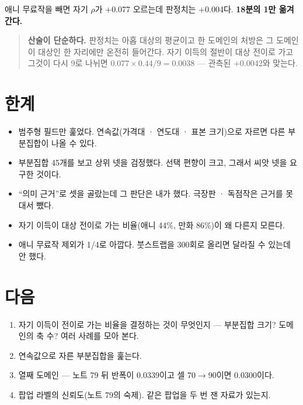 \documentclass[10pt]{article}
\begin{document}
애니 무료작을 빼면 자기 $\rho$가 $+$0.077 오르는데 판정치는 $+$0.004다.
\textbf{18분의 1만 옮겨간다.}


\begin{quote}\fontsize{9.5}{11.5}\selectfont
\textbf{산술이 단순하다.} 판정치는 아홉 대상의 평균이고 한 도메인의 처방은
그 도메인이 대상인 한 자리에만 온전히 들어간다. 자기 이득의 절반이 대상
전이로 가고 그것이 다시 9로 나뉘면 $0.077\times0.44/9=0.0038$ --- 관측된
$+$0.0042와 맞는다.
\end{quote}

\section{한계}

\begin{itemize}[leftmargin=1.1em,itemsep=0.15em]
\item 범주형 필드만 훑었다. 연속값(가격대 · 연도대 · 표본 크기)으로 자르면
      다른 부분집합이 나올 수 있다.
\item 부분집합 45개를 보고 상위 넷을 검정했다. 선택 편향이 크고, 그래서 씨앗
      넷을 요구한 것이다.
\item ``의미 근거''로 셋을 골랐는데 그 판단은 내가 했다. 극장판 · 독점작은
      근거를 못 대서 뺐다.
\item 자기 이득이 대상 전이로 가는 비율(애니 44\%, 만화 86\%)이 왜 다른지
      모른다.
\item 애니 무료작 제외가 1/4로 아깝다. 붓스트랩을 300회로 올리면 달라질 수
      있는데 안 했다.
\end{itemize}

\section{다음}

\begin{enumerate}[leftmargin=1.3em,itemsep=0.15em]
\item 자기 이득이 전이로 가는 비율을 결정하는 것이 무엇인지 --- 부분집합 크기?
      도메인의 축 수? 여러 사례를 모아 본다.
\item 연속값으로 자른 부분집합을 훑는다.
\item 열째 도메인 --- 노트 79 뒤 반폭이 0.0339이고 셀 70$\to$90이면 0.0300이다.
\item 팝업 라벨의 신뢰도(노트 79의 숙제). 같은 팝업을 두 번 잰 자료가 있는지.
\end{enumerate}
\end{document}
